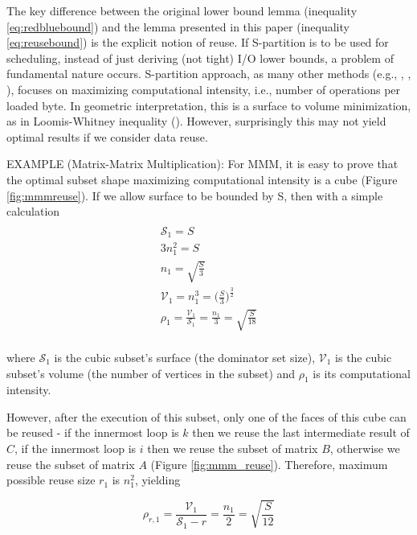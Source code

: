 \documentclass[sigconf]{acmart}
\begin{document}
The key difference between the original lower bound lemma (inequality 
\ref{eq:redbluebound}) and the lemma presented in this paper (inequality 
\ref{eq:reusebound}) is the explicit notion of reuse. 
If S-partition is to be used for scheduling, instead of just deriving 
(not tight) I/O lower bounds, a problem of fundamental nature occurs.
S-partition approach, as many other methods (e.g., \cite{IronyMMM}, 
\cite{MMM_LW}, \cite{elangoSymbolic}), focuses on maximizing computational 
intensity, 
i.e., number of operations per loaded byte. In geometric interpretation, 
this is a surface to volume minimization, as in Loomis-Whitney inequality 
(\cite{loomisWhitney}). However, surprisingly this may not yield optimal 
results if we 
consider data reuse.

EXAMPLE (Matrix-Matrix Multiplication): For MMM, it is easy to prove that 
the optimal subset shape maximizing computational intensity is a cube 
(Figure \ref{fig:mmmreuse}). If we allow surface to be bounded by S, 
then 
with a simple calculation	
\begin{multline}
\label{eq:cubic}
\\
\mathcal{S}_1 = S \\
3 n_1^2 = S \\
n_1 = \sqrt{\frac{S}{3}} \\
\mathcal{V}_1 = n_1^3 = \Big(\frac{S}{3}\Big)^{\frac{3}{2}} \\
\rho_1 = \frac{\mathcal{V}_1}{\mathcal{S}_1} = \frac{n_1}{3} = 
\sqrt{\frac{S}{18}}\\
\end{multline}

where $\mathcal{S}_1$ is the cubic subset's surface (the dominator set 
size), 
$\mathcal{V}_1$ is the cubic subset's volume (the number of vertices in 
the 
subset) and $\rho_1$ is its computational intensity.

However, after the execution of this subset, only one of the faces of 
this cube can be reused - if the innermost loop is $k$ then we reuse the 
last intermediate result of $C$, if the innermost loop is $i$ then we reuse 
the subset of matrix $B$, otherwise we reuse the subset of matrix $A$ 
(Figure \ref{fig:mmm_reuse}). Therefore, maximum possible reuse size $r_1$ 
is 
$n_1^2$, yielding 

$$\rho_{r,1} = \frac{\mathcal{V}_1}{\mathcal{S}_1 - r} = \frac{n_1}{2} = 
\sqrt{\frac{S}{12}}$$
\end{document}

